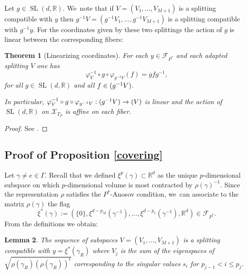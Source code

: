 \documentclass[JEP,XML,SOM,Unicode,NoEqCountersInSection,published]{cedram}
\newcommand{\NoChangel}[1]{%
\expandafter\let\csname old\string#1\endcsname=#1
\let#1=\relax
\newcommand{#1}{\mathop{\mathcode`l="716C\csname old\string#1\endcsname\mathcode`l="7160}\displaylimits}%
}
\newtheorem{theorem}{Theorem}[section]
\newtheorem{lemma}[theorem]{Lemma}
\newcommand{\R}{\mathbb{R}}
\newcommand{\F}{\mathcal{F}}
\newcommand{\X}{\mathcal{X}}
\let\G\Gamma
\let\g\gamma
\DeclareMathOperator{\nil}{Nil}\NoChangel{\nil}
\DeclareMathOperator{\SL}{SL}
\begin{document}
Let \(g \in \SL (d,\R)\). We~note that if \(V = (V_1,\ldots,V_{M+1})\) is a splitting compatible with \(y\) then \(g^{-1}V = (g^{-1}V_1,\ldots, g^{-1}V_{M+1})\) is a splitting compatible with \(g^{-1}y\).
For the coordinates given by these two splittings the action of \(g\) is linear between the corresponding fibers:

\begin{theorem}[Linearizing coordinates]\label{linearactionlemma}
For each \(y\in \F_{P^\ast} \) and each adapted splitting \(V\) one has
\[
\varphi_{V}^{-1}\circ g \circ \varphi_{g^{-1}V}(f) = g fg^{-1},
\]
for all \(g \in \SL(d,\R)\) and all \(f \in \nil (g^{-1}V)\).

In particular, \(\varphi_{V}^{-1}\circ g\circ \varphi_{g^{-1}V}:\nil(g^{-1}V) \to \nil(V)\) is linear and the action of \(\SL(d,\R) \) on \(\X_{T_P} \) is affine on each fiber.
\end{theorem}
\begin{proof} See \cite[Lem.\,6.2 \& Cor.\,6.3]{LL23}.\end{proof}

\subsection{Proof of Proposition \ref{covering}}
Let \(\g \!\neq\! e\! \in\! \G\). Recall that we defined \hbox{\(\xi^p(\gamma) \!\subset\! \R^d\)} as the unique \(p\)-dimensional subspace on which \(p\)-dimensional volume is most contracted by \(\rho(\gamma)^{-1}\).
Since the representation \(\rho\) satisfies the \(P^\ast\)-Anosov condition, we~can associate to the matrix \(\rho(\g)\) the flag
\[
 \xi^\ast(\g) := (\{0\}, \xi^{d-p_{M}}(\gamma^{-1}),\ldots,\xi^{d-p_1}(\gamma^{-1}), \R^d) \in \F_{P^\ast}.
\]
From the definitions we obtain:
\begin{lemma}\label{canonicalsplitting} The sequence of subspaces \(V = (V_1,\ldots, V_{M+1})\) is a splitting compatible with \(y =\xi^\ast (\g_R) \) where \(V_j\) is the sum of the eigenspaces of \(\sqrt {\rho(\g_R) (\rho(\g_R))^t} \) corresponding to the singular values \(s_i \) for \(p_{j-1} <i \leq p_j\). \end{lemma}
\end{document}
